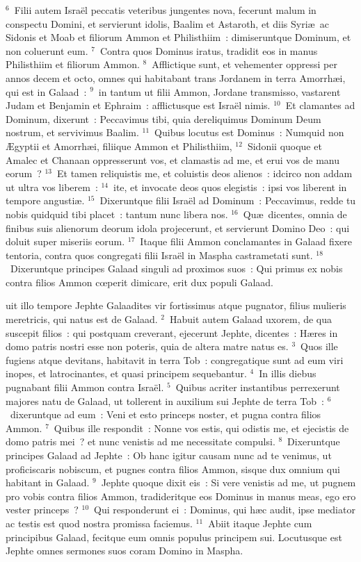 ${}^{6}$~Filii autem Isra\"el peccatis veteribus jungentes nova, fecerunt malum in conspectu Domini, et servierunt idolis, Baalim et Astaroth, et diis Syri\ae\ ac Sidonis et Moab et filiorum Ammon et Philisthiim~: dimiseruntque Dominum, et non coluerunt eum.
${}^{7}$~Contra quos Dominus iratus, tradidit eos in manus Philisthiim et filiorum Ammon.
${}^{8}$~Afflictique sunt, et vehementer oppressi per annos decem et octo, omnes qui habitabant trans Jordanem in terra Amorrh\ae i, qui est in Galaad~:
${}^{9}$~in tantum ut filii Ammon, Jordane transmisso, vastarent Judam et Benjamin et Ephraim~: afflictusque est Isra\"el nimis.
${}^{10}$~Et clamantes ad Dominum, dixerunt~: Peccavimus tibi, quia dereliquimus Dominum Deum nostrum, et servivimus Baalim.
${}^{11}$~Quibus locutus est Dominus~: Numquid non \AE gyptii et Amorrh\ae i, filiique Ammon et Philisthiim,
${}^{12}$~Sidonii quoque et Amalec et Chanaan oppresserunt vos, et clamastis ad me, et erui vos de manu eorum~?
${}^{13}$~Et tamen reliquistis me, et coluistis deos alienos~: idcirco non addam ut ultra vos liberem~:
${}^{14}$~ite, et invocate deos quos elegistis~: ipsi vos liberent in tempore angusti\ae .
${}^{15}$~Dixeruntque filii Isra\"el ad Dominum~: Peccavimus, redde tu nobis quidquid tibi placet~: tantum nunc libera nos.
${}^{16}$~Qu\ae\ dicentes, omnia de finibus suis alienorum deorum idola projecerunt, et servierunt Domino Deo~: qui doluit super miseriis eorum.
${}^{17}$~Itaque filii Ammon conclamantes in Galaad fixere tentoria, contra quos congregati filii Isra\"el in Maspha castrametati sunt.
${}^{18}$~Dixeruntque principes Galaad singuli ad proximos suos~: Qui primus ex nobis contra filios Ammon cœperit dimicare, erit dux populi Galaad.

\bchapter
{}uit illo tempore Jephte Galaadites vir fortissimus atque pugnator, filius mulieris meretricis, qui natus est de Galaad.
${}^{2}$~Habuit autem Galaad uxorem, de qua suscepit filios~: qui postquam creverant, ejecerunt Jephte, dicentes~: H\ae res in domo patris nostri esse non poteris, quia de altera matre natus es.
${}^{3}$~Quos ille fugiens atque devitans, habitavit in terra Tob~: congregatique sunt ad eum viri inopes, et latrocinantes, et quasi principem sequebantur.
${}^{4}$~In illis diebus pugnabant filii Ammon contra Isra\"el.
${}^{5}$~Quibus acriter instantibus perrexerunt majores natu de Galaad, ut tollerent in auxilium sui Jephte de terra Tob~:
${}^{6}$~dixeruntque ad eum~: Veni et esto princeps noster, et pugna contra filios Ammon.
${}^{7}$~Quibus ille respondit~: Nonne vos estis, qui odistis me, et ejecistis de domo patris mei~? et nunc venistis ad me necessitate compulsi.
${}^{8}$~Dixeruntque principes Galaad ad Jephte~: Ob hanc igitur causam nunc ad te venimus, ut proficiscaris nobiscum, et pugnes contra filios Ammon, sisque dux omnium qui habitant in Galaad.
${}^{9}$~Jephte quoque dixit eis~: Si vere venistis ad me, ut pugnem pro vobis contra filios Ammon, tradideritque eos Dominus in manus meas, ego ero vester princeps~?
${}^{10}$~Qui responderunt ei~: Dominus, qui h\ae c audit, ipse mediator ac testis est quod nostra promissa faciemus.
${}^{11}$~Abiit itaque Jephte cum principibus Galaad, fecitque eum omnis populus principem sui. Locutusque est Jephte omnes sermones suos coram Domino in Maspha.


